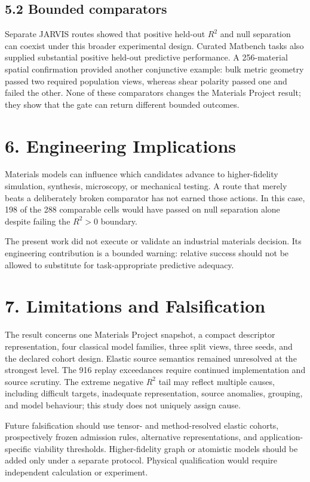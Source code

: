 \documentclass[10pt,a4paper]{article}
\begin{document}
\subsection{5.2 Bounded comparators}
Separate JARVIS routes showed that positive held-out $R^2$ and null separation can coexist under this broader experimental design. Curated Matbench tasks also supplied substantial positive held-out predictive performance. A 256-material spatial confirmation provided another conjunctive example: bulk metric geometry passed two required population views, whereas shear polarity passed one and failed the other. None of these comparators changes the Materials Project result; they show that the gate can return different bounded outcomes.

\section{6. Engineering Implications}
Materials models can influence which candidates advance to higher-fidelity simulation, synthesis, microscopy, or mechanical testing. A route that merely beats a deliberately broken comparator has not earned those actions. In this case, 198 of the 288 comparable cells would have passed on null separation alone despite failing the $R^2>0$ boundary.

The present work did not execute or validate an industrial materials decision. Its engineering contribution is a bounded warning: relative success should not be allowed to substitute for task-appropriate predictive adequacy.

\section{7. Limitations and Falsification}
The result concerns one Materials Project snapshot, a compact descriptor representation, four classical model families, three split views, three seeds, and the declared cohort design. Elastic source semantics remained unresolved at the strongest level. The 916 replay exceedances require continued implementation and source scrutiny. The extreme negative $R^2$ tail may reflect multiple causes, including difficult targets, inadequate representation, source anomalies, grouping, and model behaviour; this study does not uniquely assign cause.

Future falsification should use tensor- and method-resolved elastic cohorts, prospectively frozen admission rules, alternative representations, and application-specific viability thresholds. Higher-fidelity graph or atomistic models should be added only under a separate protocol. Physical qualification would require independent calculation or experiment.
\end{document}
